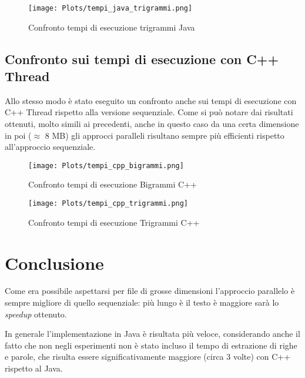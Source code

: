 \documentclass[10pt,twocolumn,letterpaper]{article}
\begin{document}
\begin{figure}[h]
\texttt{[image: Plots/tempi\_java\_trigrammi.png]}
\caption{Confronto tempi di esecuzione trigrammi Java}
\end{figure}

\subsection{Confronto sui tempi di esecuzione con C++ Thread}
Allo stesso modo è stato eseguito un confronto anche sui tempi di esecuzione con C++ Thread rispetto alla versione sequenziale.
Come si può notare dai risultati ottenuti, molto simili ai precedenti, anche in questo caso da una certa dimensione in poi ($\approx$ 8 MB) gli approcci paralleli risultano sempre più efficienti rispetto all'approccio sequenziale.
\begin{figure}[h]
\texttt{[image: Plots/tempi\_cpp\_bigrammi.png]}
\caption{Confronto tempi di esecuzione Bigrammi C++}
\end{figure}

\begin{figure}[h]
\texttt{[image: Plots/tempi\_cpp\_trigrammi.png]}
\caption{Confronto tempi di esecuzione Trigrammi C++}
\end{figure}

\section{Conclusione}
Come era possibile aspettarsi per file di grosse dimensioni l'approccio parallelo è sempre migliore di quello sequenziale: più lungo è il testo è maggiore sarà lo \textit{speedup} ottenuto.

In generale l'implementazione in Java è risultata più veloce, considerando anche il fatto che non negli esperimenti non è stato incluso il tempo di estrazione di righe e parole, che risulta essere significativamente maggiore (circa 3 volte) con C++ rispetto al Java.

{


}
\end{document}

